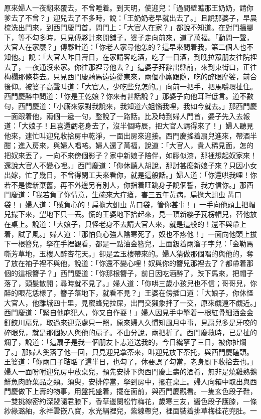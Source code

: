 原來婦人一夜翻來覆去，不曾睡着。到天明，使迎兒：「過間壁瞧那王奶奶，請你爹去了不曾？」迎兒去了不多時，說：「王奶奶老早就出去了。」且說那婆子，早晨梳洗出門來，到西門慶門首，問門上：「大官人在家？」都說不知道。在對門牆腳下，等不勾多時，只見傅夥計來開舖子，婆子走向前來，道了萬福。「動問一聲，大官人在家麼？」傅夥計道：「你老人家尋他怎的？這早來問着我，第二個人也不知他。」說：「大官人昨日壽日，在家請客吃酒，吃了一日酒，到晚拉眾朋友往院裡去了，一夜通沒來家。你往那裡尋他去？」這婆子拜辭出縣前，來到東街口，正往构欄那條巷去。只見西門慶騎馬遠遠從東來，兩個小廝跟隨，吃的醉眼摩娑，前合後仰。被婆子高聲叫道：「大官人，少吃些兒怎的。」向前一把手，把馬嚼環扯住。西門慶醉中問道：「你是王乾娘？你來有甚話說？」那婆子向他耳畔低言。道不數句，西門慶道：「小廝來家對我說來，我知道六姐惱我哩，我如今就去。」那西門慶一面跟着他，兩個一遞一句，整說了一路話。比及時到婦人門首，婆子先入去報道：「大娘子！且喜還虧老身去了，沒半個時辰，把大官人請得來了！」婦人聽見他來，連忙叫迎兒收拾房中乾淨，一面出房來迎接。西門慶搖着扇兒進來，帶酒半酣；進入房來，與婦人唱喏。婦人還了萬福，說道：「大官人，貴人稀見面，怎的把奴來丟了，一向不來傍個影子？家中新娘子陪伴，如膠似漆，那裡想起奴家來！還說大官人不變心哩。」西門慶道：「你休聽人胡說，那討甚麼新娘子來？只因小女出嫁，忙了幾日，不曾得閑工夫來看你，就是這般話。」婦人道：「你還哄我哩！你若不是憐新棄舊，再不外邊另有別人，你指着旺跳身子說個誓，我方信你。」那西門慶道：「我若負了你情意，生碗來大疔瘡，害三五年黃病，扁擔大蛆虫冓口袋！」婦人道：「賊負心的！扁擔大蛆虫冓口袋，管你甚事！」一手向他頭上把帽兒撮下來，望地下只一丟。慌的王婆地下拾起來，見一頂新纓子瓦楞帽兒，替他放在桌上。說道：「大娘子，只怪老身不去請大官人來，就是這般的！還不與帶上着，試了風。」婦人道：「那怕負心強人陰寒死了，奴也不疼他！」一面向他頭上拔下一根簪兒，拏在手裡觀看，都是一點油金簪兒，上面鈒着兩溜子字兒：「金勒馬嘶芳草地，玉樓人醉杏花天。」卻是孟玉樓帶來的。婦人猜做那個唱的與他的，奪了放在袖子裡不與他，說道：「你還不變心哩！奴與你的簪兒那裡去了？都帶着那個的這根簪子？」西門慶道：「你那根簪子，前日因吃酒醉了，跌下馬來，把帽子落了，頭髮散開；尋時就不見了。」婦人道：「你哄三歲小孩兒也不信；哥哥兒，你醉的眼花恁樣了，簪子落地下，就看不見？」王婆在傍插口道：「大娘子，你休怪大官人，他離城四十里，見蜜蜂兒拉屎，出門交獺象拌了一交，原來覷遠不覷近。」西門慶道：「緊自他麻犯人，你又自作耍！」婦人因見手中擎着一根紅骨細洒金金釘鉸川扇兒，取過來迎亮處只一照，原來婦人久慣知風月中事，見扇兒多是牙咬的碎眼兒，就是那個妙人與他的扇子。不由分說，兩把折了。西門慶救時，已是扯的爛了，說道：「這扇子是我一個朋友卜志道送我的，今日纔拏了三日，被你扯爛了。」那婦人奚落了他一回，只見迎兒拿茶來，叫迎兒放下茶托，與西門慶磕頭。王婆道：「你兩口子聐聒了這半日，也勾了，休要誤了勾當，老身廚下收拾去也。」婦人一面吩咐迎兒房中放桌兒，預先安排下與西門慶上壽的酒肴，無非是燒雞熟鵝鮮魚肉酢菓品之類。須臾，安排停當，拏到房中，擺在桌上。婦人向箱中取出與西門慶做下上壽的物事，用盤托盛着，擺在面前，與西門慶觀看。一隻玄色段子鞋，一雙挑線密約深盟隨君膝下，香草邊闌松竹梅花，歲寒三友，醬色段子護膝，一條紗綠潞紬，永祥雲嵌八寶，水光絹裡兒，紫線帶兒，裡面裝着排草梅桂花兜肚。一